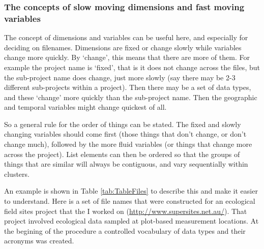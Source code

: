 \documentclass[11pt,a4paper]{article}
\begin{document}
\subsubsection{The concepts of slow moving dimensions and fast moving
variables}\label{the-concepts-of-slow-moving-dimensions-and-fast-moving-variables}

The concept of dimensions and variables can be useful here, and
especially for deciding on filenames. Dimensions are fixed or change
slowly while variables change more quickly. By `change', this means that
there are more of them. For example the project name is `fixed', that is
it does not change across the files, but the sub-project name does
change, just more slowly (say there may be 2-3 different sub-projects
within a project). Then there may be a set of data types, and these
`change' more quickly than the sub-project name. Then the geographic and
temporal variables might change quickest of all.

So a general rule for the order of things can be stated. The fixed and
slowly changing variables should come first (those things that don't
change, or don't change much), followed by the more fluid variables (or
things that change more across the project). List elements can then be
ordered so that the groups of things that are similar will always be
contiguous, and vary sequentially within clusters.

An example is shown in Table \ref{tab:TableFiles} to describe this and
make it easier to understand. Here is a set of file names that were
constructed for an ecological field sites project that the I worked on
(\href{http://www.supersites.net.au/}{\url{http://www.supersites.net.au/}}).
That project involved ecological data sampled at plot-based measurement
locations. At the begining of the procedure a controlled vocabulary of
data types and their acronyms was created.
\end{document}
